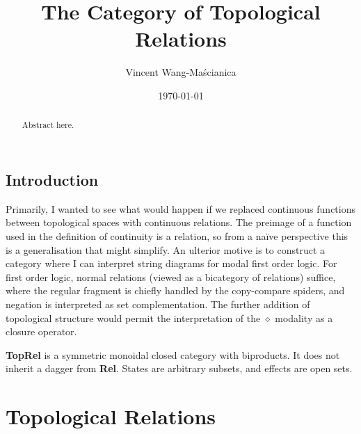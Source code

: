 \documentclass{tufte-handout}
\title{The Category of Topological Relations}
\author[me]{Vincent Wang-Ma\'{s}cianica}
\date{\today}
\theoremstyle{definition}
\newtheorem{rem}[theorem]{Reminder}
\begin{document}
\maketitle%

\begin{abstract}
Abstract here.
\end{abstract}

\begin{fullwidth}
\section{Introduction}

Primarily, I wanted to see what would happen if we replaced continuous functions between topological spaces with continuous relations. The preimage of a function used in the definition of continuity is a relation, so from a na\"{i}ve perspective this is a generalisation that might simplify. An ulterior motive is to construct a category where I can interpret string diagrams for modal first order logic. For first order logic, normal relations (viewed as a bicategory of relations) suffice, where the regular fragment is chiefly handled by the copy-compare spiders, and negation is interpreted as set complementation. The further addition of topological structure would permit the interpretation of the $\diamond$ modality as a closure operator.

 \textbf{TopRel} is a symmetric monoidal closed category with biproducts. It does not inherit a dagger from \textbf{Rel}. States are arbitrary subsets, and effects are open sets.

\end{fullwidth}

\section{Topological Relations}

\end{document}
